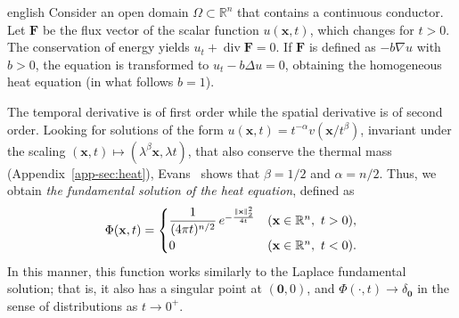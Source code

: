 \documentclass[0000.tex]{subfiles}
\begin{document}
\begin{hyphenrules}{english}
Consider an open domain $\Omega\subset\mathbb{R}^n$ that contains a continuous conductor. Let $\mathbf{F}$ be the flux
vector of the scalar function $u(\mathbf{x},t)$, which changes for $t>0$. The conservation of energy yields
$u_t+\operatorname{div}\mathbf{F}=0$. If $\mathbf{F}$ is defined as $-b\nabla u$ with $b>0$, the equation is transformed
to $u_t-b\Delta u=0$, obtaining the homogeneous heat equation (in what follows $b=1$).

The temporal derivative is of first order while the spatial derivative is of second order. Looking for
solutions of the form $u(\mathbf{x},t)=t^{-\alpha}v(\mathbf{x}/t^{\beta})$, invariant under the scaling
$(\mathbf{x},t)\mapsto(\lambda^{\beta}\mathbf{x},\lambda t)$, that also conserve the thermal mass
(Appendix~\ref{app-sec:heat}), Evans~\cite{evans2010} shows that $\beta=1/2$ and $\alpha=n/2$. Thus, we obtain
\emph{the fundamental solution of the heat equation}, defined as
\begin{equation}
  \Phi(\mathbf{x},t)=
  \begin{cases}
    \dfrac{1}{(4\pi t)^{n/2}}\,e^{-\frac{\left\lVert \mathbf{x} \right\rVert_2^2}{4t}} & (\mathbf{x}\in\mathbb{R}^n,\ t>0),\\[2mm]
    0 & (\mathbf{x}\in\mathbb{R}^n,\ t<0).
  \end{cases}
  \label{eq:heat-fundamental}
\end{equation}
In this manner, this function works similarly to the Laplace fundamental solution; that is, it also has
a singular point at $(\mathbf{0},0)$, and $\Phi(\cdot,t)\to\delta_{\mathbf{0}}$ in the sense of
distributions as $t\to0^+$.


\end{hyphenrules}
\end{document}
